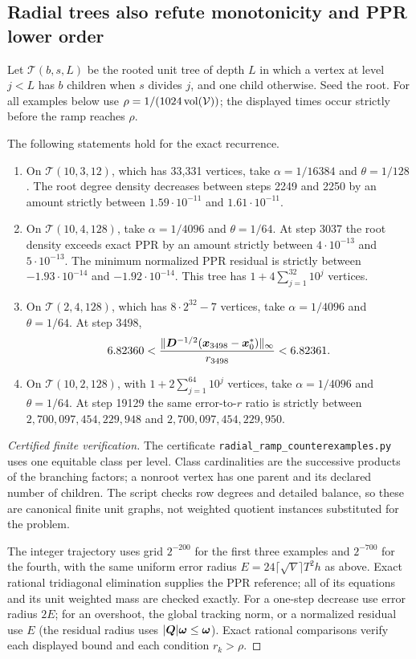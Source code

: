 \subsection{Radial trees also refute monotonicity and PPR lower order}
Let $\mathcal T(b,s,L)$ be the rooted unit tree of depth $L$ in which a
vertex at level $j<L$ has $b$ children when $s$ divides $j$, and one child
otherwise. Seed the root. For all examples below use
$\rho=1/(1024\operatorname{vol}(\mathcal V))$; the displayed times occur strictly before
the ramp reaches $\rho$.

\begin{proposition}
\label{prop:revisit-radial-failures}
The following statements hold for the exact recurrence.
\begin{enumerate}
\item On $\mathcal T(10,3,12)$, which has 33,331 vertices, take
$\alpha=1/16384$ and $\theta=1/128$. The root degree density decreases
between steps 2249 and 2250 by an amount strictly between
$1.59\cdot10^{-11}$ and $1.61\cdot10^{-11}$.
\item On $\mathcal T(10,4,128)$, take $\alpha=1/4096$ and
$\theta=1/64$. At step 3037 the root density exceeds exact PPR by an
amount strictly between $4\cdot10^{-13}$ and $5\cdot10^{-13}$.
The minimum normalized PPR residual is strictly between
$-1.93\cdot10^{-14}$ and $-1.92\cdot10^{-14}$.
This tree has $1+4\sum_{j=1}^{32}10^j$ vertices.
\item On $\mathcal T(2,4,128)$, which has $8\cdot2^{32}-7$ vertices,
take $\alpha=1/4096$ and $\theta=1/64$. At step 3498,
\[
 6.82360<
 \frac{\|\bm{D}^{-1/2}(\bm{x}_{3498}-\bm{x}_0^*)\|_\infty}{r_{3498}}
 <6.82361.
\]
\item On $\mathcal T(10,2,128)$, with
$1+2\sum_{j=1}^{64}10^j$ vertices, take $\alpha=1/4096$ and
$\theta=1/64$. At step 19129 the same error-to-$r$ ratio is strictly
between $2{,}700{,}097{,}454{,}229{,}948$ and
$2{,}700{,}097{,}454{,}229{,}950$.
\end{enumerate}
\end{proposition}
\begin{proof}[Certified finite verification]
The certificate \texttt{radial\_ramp\_counterexamples.py} uses one
equitable class per level. Class cardinalities are the successive products
of the branching factors; a nonroot vertex has one parent and its declared
number of children. The script checks row degrees and detailed balance,
so these are canonical finite unit graphs, not weighted quotient instances
substituted for the problem.

The integer trajectory uses grid $2^{-200}$ for the first three examples
and $2^{-700}$ for the fourth, with the same uniform error radius
$E=24\lceil\sqrt V\rceil T^2 h$ as above.
Exact rational tridiagonal elimination supplies the PPR reference; all of
its equations and its unit weighted mass are checked exactly. For a
one-step decrease use error radius $2E$; for an overshoot, the global
tracking norm, or a normalized residual use $E$ (the residual radius uses
$|\bm{Q}|\bm{\omega}\leq\bm{\omega}$). Exact rational comparisons verify each
displayed bound and each condition $r_k>\rho$.
\end{proof}

